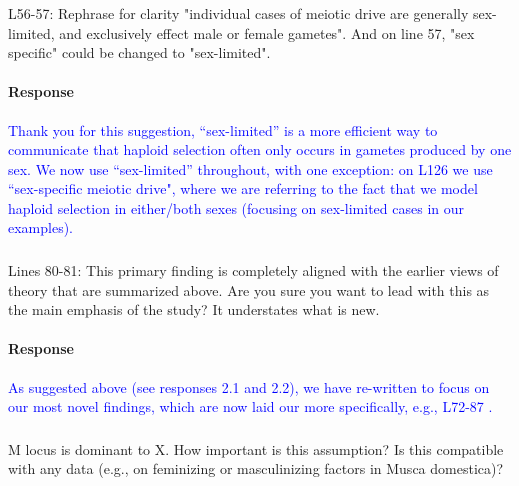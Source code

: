 \documentclass[10pt,letterpaper]{article}
\begin{document}
\noindent\subsubsection{}
L56-57: Rephrase for clarity "individual cases of meiotic drive are generally sex-limited, and exclusively effect male or female gametes". And on line 57, "sex specific" could be changed to "sex-limited".

\noindent\paragraph{Response}
\textcolor{blue}{
Thank you for this suggestion, ``sex-limited'' is a more efficient way to communicate that haploid selection often only occurs in gametes produced by one sex. 
We now use ``sex-limited'' throughout, with one exception: on L126 we use ``sex-specific meiotic drive", where we are referring to the fact that we model haploid selection in either/both sexes (focusing on sex-limited cases in our examples). 
}

\noindent\subsubsection{}
Lines 80-81: This primary finding is completely aligned with the earlier views of theory that are summarized above. Are you sure you want to lead with this as the main emphasis of the study? It understates what is new.

\noindent\paragraph{Response}
\textcolor{blue}{
As suggested above (see responses 2.1 and 2.2), we have re-written to focus on our most novel findings, which are now laid our more specifically, e.g., L72-87 . 
}

\noindent\subsubsection{}
M locus is dominant to X. How important is this assumption? Is this compatible with any data (e.g., on feminizing or masculinizing factors in Musca domestica)?
\end{document}
